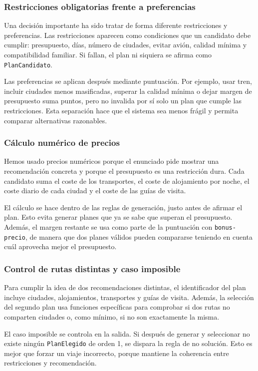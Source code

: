 \documentclass[11pt,a4paper]{article}
\begin{document}
\subsubsection{Restricciones obligatorias frente a preferencias}
Una decisi\'on importante ha sido tratar de forma diferente restricciones y
preferencias. Las restricciones aparecen como condiciones que un candidato debe
cumplir: presupuesto, d\'ias, n\'umero de ciudades, evitar avi\'on, calidad m\'inima
y compatibilidad familiar. Si fallan, el plan ni siquiera se afirma como
\texttt{PlanCandidato}.

Las preferencias se aplican despu\'es mediante puntuaci\'on. Por ejemplo, usar
tren, incluir ciudades menos masificadas, superar la calidad m\'inima o dejar
margen de presupuesto suma puntos, pero no invalida por s\'i solo un plan que
cumple las restricciones. Esta separaci\'on hace que el sistema sea menos
fr\'agil y permita comparar alternativas razonables.

\subsubsection{C\'alculo num\'erico de precios}
Hemos usado precios num\'ericos porque el enunciado pide mostrar una
recomendaci\'on concreta y porque el presupuesto es una restricci\'on dura. Cada
candidato suma el coste de los transportes, el coste de alojamiento por noche,
el coste diario de cada ciudad y el coste de las gu\'ias de visita.

El c\'alculo se hace dentro de las reglas de generaci\'on, justo antes de afirmar
el plan. Esto evita generar planes que ya se sabe que superan el presupuesto.
Adem\'as, el margen restante se usa como parte de la puntuaci\'on con
\texttt{bonus-precio}, de manera que dos planes v\'alidos pueden compararse
teniendo en cuenta cu\'al aprovecha mejor el presupuesto.

\subsubsection{Control de rutas distintas y caso imposible}
Para cumplir la idea de dos recomendaciones distintas, el identificador del
plan incluye ciudades, alojamientos, transportes y gu\'ias de visita. Adem\'as,
la selecci\'on del segundo plan usa funciones espec\'ificas para comprobar si dos
rutas no comparten ciudades o, como m\'inimo, si no son exactamente la misma.

El caso imposible se controla en la salida. Si despu\'es de generar y seleccionar
no existe ning\'un \texttt{PlanElegido} de orden 1, se dispara la regla de no
soluci\'on. Esto es mejor que forzar un viaje incorrecto, porque mantiene la
coherencia entre restricciones y recomendaci\'on.
\end{document}
